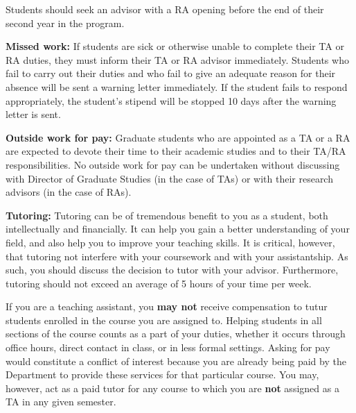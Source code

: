 Students should seek an advisor with a RA opening before the end of
their second year in the program.

\textbf{Missed work:} If students are sick or otherwise unable to
complete their TA or RA duties, they must inform their TA or RA
advisor immediately. Students who fail to carry out their duties and
who fail to give an adequate reason for their absence will be sent a
warning letter immediately. If the student fails to respond
appropriately, the student’s stipend will be stopped 10 days after the
warning letter is sent.

\textbf{Outside work for pay:} Graduate students who are appointed as a TA
or a RA are expected to devote their time to their academic studies
and to their TA/RA responsibilities. No outside work for pay can be
undertaken without discussing with Director of Graduate Studies (in
the case of TAs) or with their research advisors (in the case of RAs).

\textbf{Tutoring:} Tutoring can be of tremendous benefit to you as a
student, both intellectually and financially.  It can help you gain a
better understanding of your field, and also help you to improve your
teaching skills.  It is critical, however, that tutoring not interfere
with your coursework and with your assistantship.  As such, you should
discuss the decision to tutor with your advisor.  Furthermore,
tutoring should not exceed an average of 5 hours of your time per
week.

If you are a teaching assistant, you \textbf{may not} receive compensation to
tutur students enrolled in the course you are assigned to.  Helping
students in all sections of the course counts as a part of your
duties, whether it occurs through office hours, direct contact in
class, or in less formal settings.  Asking for pay would constitute a
conflict of interest because you are already being paid by the
Department to provide these services for that particular course.  You
may, however, act as a paid tutor for any course to which you are
\textbf{not} assigned as a TA in any given semester.
